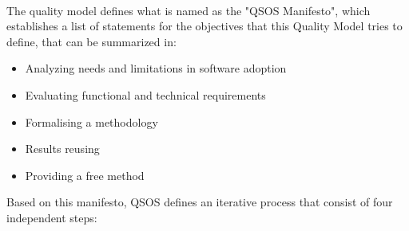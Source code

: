\documentclass[11pt]{article}
\begin{document}
\begin{itemize}
\begin{itemize}
\\
The quality model defines what is named as the "QSOS Manifesto", which establishes a list of statements for the objectives that this Quality Model tries to define, that can be summarized in:
\begin{itemize}\itemsep0pt
\item{Analyzing needs and limitations in software adoption}
\item{Evaluating functional and technical requirements}
\item{Formalising a methodology}
\item{Results reusing}
\item{Providing a free method}
\end{itemize}
Based on this manifesto, QSOS defines an iterative process that consist of four independent steps:


\end{itemize}
\end{itemize}
\end{document}
